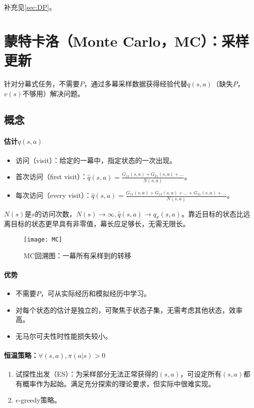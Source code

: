 \documentclass[
12pt, %
a4paper, 
oneside, %
headinclude,footinclude, %
]{scrartcl}
\begin{document}
补充见\ref{sec:DP}。
\section[蒙特卡洛]{蒙特卡洛（Monte Carlo，MC）：采样更新}
针对分幕式任务，不需要$ P $，通过多幕采样数据获得经验代替$ q(s, a) $（缺失$ P $，$ v(s) $不够用）解决问题。
\subsection[概念]{概念}
\paragraph{估计$ q(s, a) $}
\begin{itemize}
\item 访问（visit）：给定的一幕中，指定状态的一次出现。
\item 首次访问（first visit）：$ \hat{q}(s, a) = \frac{G_{11}(s, a) + G_{21}(s, a) + \dots}{N(s, a)} $。
\item 每次访问（every visit）：$ \hat{q}(s, a) = \frac{G_{11}(s, a) + G_{12}(s, a) + \dots + G_{21}(s, a) + \dots}{N(s, a)} $。
\end{itemize}

$ N(s) $是$ s $的访问次数，$ N(s) \to \infty, \hat{q}(s, a) \to q_{\pi}(s, a) $。靠近目标的状态比远离目标的状态更早具有非零值，幕长应足够长，无需无限长。

\begin{figure}[H]
\centering 
\texttt{[image: MC]} 
\caption{MC回溯图：一幕所有采样到的转移}
\end{figure}
\paragraph{优势}
\begin{itemize}
\item 不需要$ P $，可从实际经历和模拟经历中学习。
\item 对每个状态的估计是独立的，可聚焦于状态子集，无需考虑其他状态，效率高。
\item 无马尔可夫性时性能损失较小。
\end{itemize}
\paragraph{恒温策略：$ \forall(s, a), \pi(a|s) > 0 $}
\begin{enumerate}
\item 试探性出发（ES）：为采样部分无法正常获得的$ (s, a) $，可设定所有$ (s, a) $都有概率作为起始。满足充分探索的理论要求，但实际中很难实现。
\item $ \epsilon $-greedy策略。
\end{enumerate}
\end{document}
